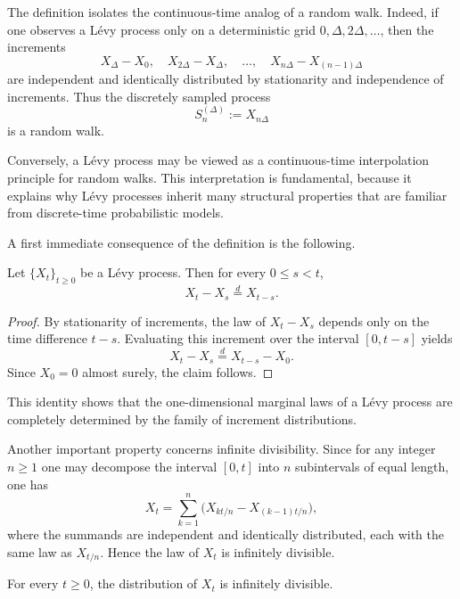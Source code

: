 The definition isolates the continuous-time analog of a random walk. Indeed, if one observes a L\'evy process only on a deterministic grid $0,\Delta,2\Delta,\dots$, then the increments
\[
X_{\Delta}-X_0,\quad X_{2\Delta}-X_{\Delta},\quad \dots,\quad X_{n\Delta}-X_{(n-1)\Delta}
\]
are independent and identically distributed by stationarity and independence of increments. Thus the discretely sampled process
\begin{equation}
S_n^{(\Delta)} := X_{n\Delta}
\end{equation}
is a random walk.

Conversely, a L\'evy process may be viewed as a continuous-time interpolation principle for random walks. This interpretation is fundamental, because it explains why L\'evy processes inherit many structural properties that are familiar from discrete-time probabilistic models.

\medskip

A first immediate consequence of the definition is the following.

\begin{theorem}
Let $\{X_t\}_{t\geq 0}$ be a L\'evy process. Then for every $0\leq s<t$,
\begin{equation}
X_t-X_s \overset{d}{=} X_{t-s}.
\end{equation}
\end{theorem}

\begin{proof}
By stationarity of increments, the law of $X_t-X_s$ depends only on the time difference $t-s$. Evaluating this increment over the interval $[0,t-s]$ yields
\[
X_t-X_s \overset{d}{=} X_{t-s}-X_0.
\]
Since $X_0=0$ almost surely, the claim follows.
\end{proof}

This identity shows that the one-dimensional marginal laws of a L\'evy process are completely determined by the family of increment distributions.

\medskip

Another important property concerns infinite divisibility. Since for any integer $n\geq 1$ one may decompose the interval $[0,t]$ into $n$ subintervals of equal length, one has
\[
X_t
=
\sum_{k=1}^{n}\bigl(X_{kt/n}-X_{(k-1)t/n}\bigr),
\]
where the summands are independent and identically distributed, each with the same law as $X_{t/n}$. Hence the law of $X_t$ is infinitely divisible.

\begin{theorem}
For every $t\geq 0$, the distribution of $X_t$ is infinitely divisible.
\end{theorem}

